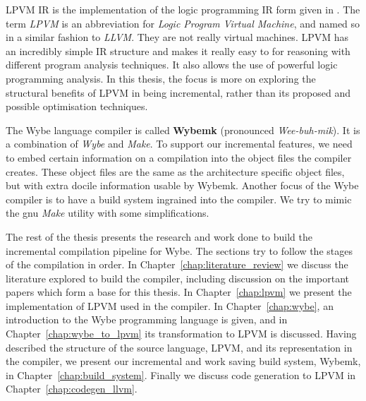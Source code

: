 LPVM IR is the implementation of the logic programming IR form given in
\cite{lpvm2015}. The term \textit{LPVM} is an abbreviation for \textit{Logic
  Program Virtual Machine}, and named so in a similar fashion to
\textit{LLVM}. They are not really virtual machines. LPVM has an incredibly
simple IR structure and makes it really easy to for reasoning with different
program analysis techniques. It also allows the use of powerful logic
programming analysis. In this thesis, the focus is more on exploring the
structural benefits of LPVM in being incremental, rather than its proposed and
possible optimisation techniques.

The Wybe language compiler is called \textbf{Wybemk} (pronounced
\textit{Wee-buh-mik}). It is a combination of \textit{Wybe} and
\textit{Make}. To support our incremental features, we need to embed certain
information on a compilation into the object files the compiler creates. These
object files are the same as the architecture specific object files, but with
extra docile information usable by Wybemk. Another focus of the Wybe compiler
is to have a build system ingrained into the compiler. We try to mimic the gnu
\textit{Make} utility with some simplifications.


The rest of the thesis presents the research and work done to build the
incremental compilation pipeline for Wybe. The sections try to follow the stages of
the compilation in order. In Chapter~\ref{chap:literature_review} we discuss
the literature explored to build the compiler, including discussion on the
important papers which form a base for this thesis. In Chapter~\ref{chap:lpvm}
we present the implementation of LPVM used in the compiler. In
Chapter~\ref{chap:wybe}, an introduction to the Wybe programming language is
given, and in Chapter~\ref{chap:wybe_to_lpvm} its transformation to LPVM is
discussed. Having described the structure of the source language, LPVM, and its
representation in the compiler, we present our incremental and work saving
build system, Wybemk, in Chapter~\ref{chap:build_system}. Finally we discuss
code generation to LPVM in Chapter~\ref{chap:codegen_llvm}.



